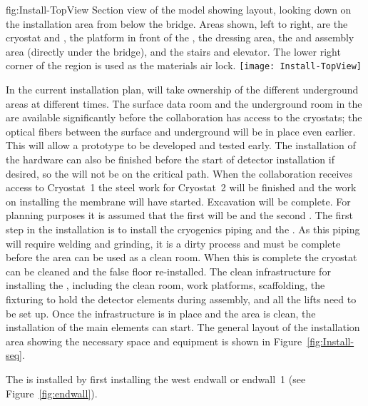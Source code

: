 \begin{dunefigure}{fig:Install-TopView}
  {Section view of the \threed model showing layout, looking down on the installation area from below the bridge. Areas shown, left to right,  are the cryostat and , the platform in front of the , the dressing area, the  and  assembly area (directly under the bridge), and the stairs and elevator. The lower right corner of the region is used as the materials air lock.}
\texttt{[image: Install-TopView]}
\end{dunefigure}





In the current installation plan,  will take
ownership of the different underground areas at different times. The
surface data room and the underground room in the  are available
significantly before the collaboration has access to the cryostats; 
the optical fibers between the surface and underground will be in
place even earlier. This will allow a  prototype to be developed
and tested early. The installation of the  hardware can also be
finished before the start of detector installation if desired, so the
 will not be on the critical path.  When the collaboration receives
access to Cryostat~1 the steel work for Cryostat~2 will be
finished and the work on installing the membrane will have
started. Excavation will be complete.  For planning purposes it is
assumed that the first  will be  and the second
. The first step in the  installation is to
install the cryogenics piping and the . As this piping will
require welding and grinding, it is a dirty process and must be
complete before the area can be used as a clean room. When this is
complete the cryostat can be cleaned and the false floor
re-installed. The clean infrastructure for installing the ,
including the clean room, work platforms, scaffolding, the
fixturing to hold the detector elements during assembly, and all the
lifts need to be set up. Once the infrastructure is in place and the
area is clean, the installation of the main elements can start. The
general layout of the installation area showing the necessary space
and equipment is shown in Figure~\ref{fig:Install-seq}. 

The   is installed by first installing the west endwall or
endwall~1 (see Figure~\ref{fig:endwall}).


